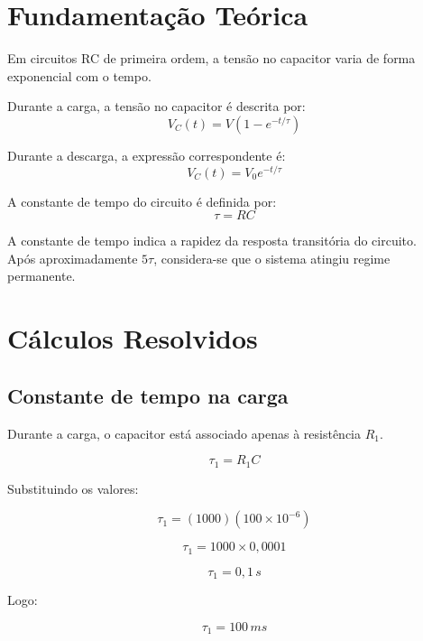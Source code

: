 \documentclass[12pt,a4paper]{article}
\begin{document}
\section{Fundamentação Teórica}

Em circuitos RC de primeira ordem, a tensão no capacitor varia de forma exponencial com o tempo.

\begin{calcbox}
Durante a carga, a tensão no capacitor é descrita por:
\[
V_C(t)=V\left(1-e^{-t/\tau}\right)
\]
\end{calcbox}

\begin{calcbox}
Durante a descarga, a expressão correspondente é:
\[
V_C(t)=V_0e^{-t/\tau}
\]
\end{calcbox}

\begin{calcbox}
A constante de tempo do circuito é definida por:
\[
\tau = RC
\]
\end{calcbox}

A constante de tempo indica a rapidez da resposta transitória do circuito. \\ Após aproximadamente $5\tau$, considera-se que o sistema atingiu regime permanente.

\newpage
\section{Cálculos Resolvidos}

\subsection{Constante de tempo na carga}

Durante a carga, o capacitor está associado apenas à resistência $R_1$.

\begin{calcbox}
\[
\tau_1 = R_1C
\]

Substituindo os valores:

\[
\tau_1 = (1000)(100 \times 10^{-6})
\]

\[
\tau_1 = 1000 \times 0{,}0001
\]

\[
\tau_1 = 0{,}1\,s
\]

Logo:

\[
\tau_1 = 100\,ms
\]
\end{calcbox}
\end{document}
